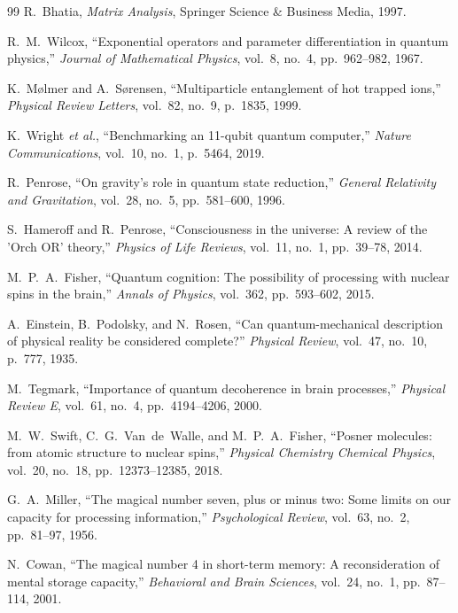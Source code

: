 \documentclass[10pt,twocolumn,3p]{article}
\begin{document}
\begin{thebibliography}{99}
R.~Bhatia,
\textit{Matrix Analysis},
Springer Science \& Business Media, 1997.

R.~M.~Wilcox,
``Exponential operators and parameter differentiation in quantum physics,''
\textit{Journal of Mathematical Physics}, vol.~8, no.~4, pp.~962--982, 1967.

K.~M\o lmer and A.~S\o rensen,
``Multiparticle entanglement of hot trapped ions,''
\textit{Physical Review Letters}, vol.~82, no.~9, p.~1835, 1999.

K.~Wright \textit{et al.},
``Benchmarking an 11-qubit quantum computer,''
\textit{Nature Communications}, vol.~10, no.~1, p.~5464, 2019.

R.~Penrose,
``On gravity's role in quantum state reduction,''
\textit{General Relativity and Gravitation}, vol.~28, no.~5, pp.~581--600, 1996.

S.~Hameroff and R.~Penrose,
``Consciousness in the universe: A review of the 'Orch OR' theory,''
\textit{Physics of Life Reviews}, vol.~11, no.~1, pp.~39--78, 2014.

M.~P.~A.~Fisher,
``Quantum cognition: The possibility of processing with nuclear spins in the brain,''
\textit{Annals of Physics}, vol.~362, pp.~593--602, 2015.

A.~Einstein, B.~Podolsky, and N.~Rosen,
``Can quantum-mechanical description of physical reality be considered complete?''
\textit{Physical Review}, vol.~47, no.~10, p.~777, 1935.

M.~Tegmark,
``Importance of quantum decoherence in brain processes,''
\textit{Physical Review E}, vol.~61, no.~4, pp.~4194--4206, 2000.

M.~W.~Swift, C.~G.~Van~de~Walle, and M.~P.~A.~Fisher,
``Posner molecules: from atomic structure to nuclear spins,''
\textit{Physical Chemistry Chemical Physics}, vol.~20, no.~18, pp.~12373--12385, 2018.

G.~A.~Miller,
``The magical number seven, plus or minus two: Some limits on our capacity for processing information,''
\textit{Psychological Review}, vol.~63, no.~2, pp.~81--97, 1956.

N.~Cowan,
``The magical number 4 in short-term memory: A reconsideration of mental storage capacity,''
\textit{Behavioral and Brain Sciences}, vol.~24, no.~1, pp.~87--114, 2001.


\end{thebibliography}
\end{document}
